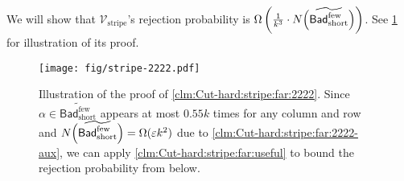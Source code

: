 \documentclass[11pt,fleqn]{article}
\renewcommand{\epsilon}{\varepsilon}
\renewcommand{\tilde}{\widetilde}
\newcommand{\V}{\calV}
\newcommand{\Vstripe}{\V_\mathrm{stripe}}
\newcommand{\Bad}{\mathsf{Bad}}
\newcommand{\Badlss}{\Bad^\mathrm{few}}
\newcommand{\BadlssS}{\Badlss_\mathrm{short}}
\newcommand{\calV}{\mathcal{V}}
\theoremstyle{definition}
\numberwithin{equation}{section}
\begin{document}
We will show that $\Vstripe$'s rejection probability is
$\Omega\left(\frac{1}{k^3}\cdot N\Bigl(\tilde{\BadlssS}\Bigr)\right)$.
See \cref{fig:Cut-hard:stripe:far:2222} for illustration of its proof.


\begin{figure}[t]
    \centering
    \texttt{[image: fig/stripe-2222.pdf]}
    \caption{
        Illustration of the proof of \cref{clm:Cut-hard:stripe:far:2222}.
        Since $\alpha \in \tilde{\BadlssS}$ appears at most $0.55k$ times for any column and row
        and $N\Bigl(\tilde{\BadlssS}\Bigr) = \Omega(\epsilon k^2)$
        due to \cref{clm:Cut-hard:stripe:far:2222-aux},
        we can apply \cref{clm:Cut-hard:stripe:far:useful} to bound
        the rejection probability from below.
    }
    \label{fig:Cut-hard:stripe:far:2222}
\end{figure}
\end{document}
